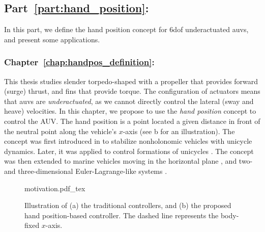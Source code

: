 \subsection{Part~\ref{part:hand_position}: }

In this part, we define the hand position concept for 6\gls{dof} underactuated \glspl{auv}, and present some applications.

\subsubsection{Chapter~\ref{chap:handpos_definition}: }

This thesis studies slender torpedo-shaped  with a propeller that provides forward (surge) thrust, and fins that provide torque.
The configuration of actuators means that \glspl{auv} are \emph{underactuated}, as we cannot directly control the lateral (sway and heave) velocities.
In this chapter, we propose to use the \emph{hand position} concept to control the AUV.
The hand position is a point located a given distance in front of the neutral point along the vehicle's $x$-axis (see b for an illustration).
The concept was first introduced in \cite{pomet_hand-position_1992} to stabilize nonholonomic vehicles with unicycle dynamics.
Later, it was applied to control formations of unicycles \cite{lawton_hand-position-formation_2003}.
The concept was then extended to marine vehicles moving in the horizontal plane \cite{paliotta_trajectory_2019}, and two- and three-dimensional Euler-Lagrange-like systems \cite{cai_hand-position-rigidity-planar_2015,li_hand-position-rigidity-3d_2021}.

\begin{figure}[b]
    \centering
    \def\svgwidth{0.65\textwidth}
    {motivation.pdf_tex}
    \caption{Illustration of (a) the traditional controllers, and (b) the proposed hand position-based controller. The dashed line represents the body-fixed $x$-axis.}
    \label{fig:handpos_def_motivation}
\end{figure}

